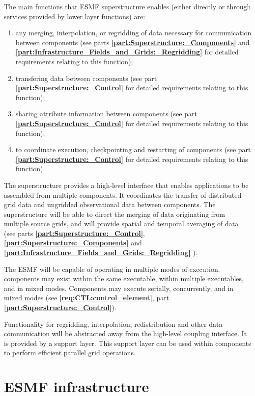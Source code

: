 \noindent The main functions that ESMF superstructure enables (either
directly or through services provided by lower layer functions) are:

\begin{enumerate}
\item any merging, interpolation, or regridding 
of data necessary for communication between components
(see parts {\bf \ref{part:Superstructure:_Components} }
and {\bf \ref{part:Infrastructure_Fields_and_Grids:_Regridding} } for detailed requirements relating
to this function);
\item transfering data between components (see part {\bf \ref{part:Superstructure:_Control} } for detailed 
requirements relating to this function);
\item sharing attribute information between components
(see part {\bf \ref{part:Superstructure:_Control} } for detailed requirements relating
to this function);
\item to coordinate execution, checkpointing and restarting of
  components (see part {\bf \ref{part:Superstructure:_Control} } for detailed 
requirements relating to this function).
\end{enumerate}

The superstructure provides a high-level interface that enables 
applications to be assembled from multiple components.  It coordinates
the transfer of distributed grid data and ungridded 
observational data between components.  The superstructure will be able 
to direct the merging of data originating from multiple source grids, and will 
provide spatial and temporal averaging of data (see parts 
{\bf \ref{part:Superstructure:_Control}}, {\bf \ref{part:Superstructure:_Components}}
and {\bf \ref{part:Infrastructure_Fields_and_Grids:_Regridding} }).

The ESMF will be capable of operating in multiple modes of execution.
components may exist within the same executable, within multiple 
executables, and in mixed modes.  Components may execute serially, 
concurrently, and in mixed modes (see {\bf \ref{req:CTL:control_element}},
part {\bf \ref{part:Superstructure:_Control}}).


Functionality for regridding, interpolation, redistribution and other 
data communication will be abstracted away from the high-level coupling
interface.  It is provided by a support layer.  
This support layer can be used within components
to perform efficient parallel grid operations.

\section{ESMF infrastructure}
\label{sec:ESMF_infrastructure}

